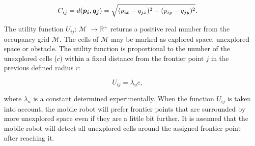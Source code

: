 \documentclass[letterpaper, 10 pt, conference]{ieeeconf}  %
\begin{document}
\begin{equation}\small
    C_{ij}=d(\boldsymbol{p_{i}}, \boldsymbol{q_{j}}) = \sqrt{(p_{ix}-q_{jx})^{2}+(p_{iy}-q_{jy})^{2}}.
    \label{cost}
\end{equation}

The utility function $U_{ij}$:  \(\text{$\mathcal {M}$}\) \(\rightarrow \text{$\mathbb{R}^{+}$}\) returns a positive real number from the occupancy grid \(\text{$\mathcal {M}$}\). The cells of \(\text{$\mathcal {M}$}\) may be marked as explored space, unexplored space or obstacle. The utility function is proportional to the number of the unexplored cells ($c$) within a fixed distance from the frontier point $j$ in the previous defined radius $r$: 

\begin{equation}
    U_{ij} = \lambda_{u}c,
\end{equation}

where $\lambda_{u}$ is a constant determined experimentally. When the function $U_{ij}$ is taken into account, the mobile robot will prefer frontier points that are surrounded by more unexplored space even if they are a little bit further. 
It is assumed that the mobile robot will detect all unexplored cells around the assigned frontier point after reaching it. 
\end{document}
